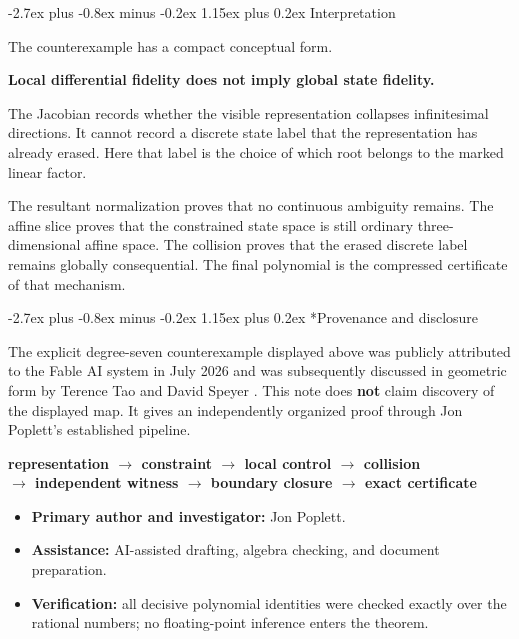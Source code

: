 \documentclass[11pt,letterpaper]{article}
\makeatletter
\theoremstyle{jgpplain}
\renewcommand{\section}{\@startsection{section}{1}{0pt}%
  {-2.7ex plus -0.8ex minus -0.2ex}%
  {1.15ex plus 0.2ex}%
  {\normalfont\sffamily\Large\bfseries\color{JGPBlue}}}
\makeatother
\begin{document}
\section{Interpretation}

The counterexample has a compact conceptual form.

\begin{mechanismbox}
\centering\bfseries\color{JGPInk}
Local differential fidelity does not imply global state fidelity.
\end{mechanismbox}

The Jacobian records whether the visible representation collapses
infinitesimal directions. It cannot record a discrete state label that the
representation has already erased. Here that label is the choice of which root
belongs to the marked linear factor.

The resultant normalization proves that no continuous ambiguity remains. The
affine slice proves that the constrained state space is still ordinary
three-dimensional affine space. The collision proves that the erased discrete
label remains globally consequential. The final polynomial is the compressed
certificate of that mechanism.

\section*{Provenance and disclosure}

The explicit degree-seven counterexample displayed above was publicly
attributed to the Fable AI system in July 2026 and was subsequently discussed
in geometric form by Terence Tao and David Speyer
\cite{Tao2026,Speyer2026}. This note does
\textbf{not} claim discovery of the displayed map. It gives an independently
organized proof through Jon Poplett's established pipeline.

\begin{routebox}
\centering\sffamily\bfseries\color{JGPDarkBlue}
representation \(\longrightarrow\) constraint
\(\longrightarrow\) local control
\(\longrightarrow\) collision\\[2pt]
\(\longrightarrow\) independent witness
\(\longrightarrow\) boundary closure
\(\longrightarrow\) exact certificate
\end{routebox}

\begin{itemize}
  \item \textbf{Primary author and investigator:} Jon Poplett.
  \item \textbf{Assistance:} AI-assisted drafting, algebra checking, and
        document preparation.
  \item \textbf{Verification:} all decisive polynomial identities were checked
        exactly over the rational numbers; no floating-point inference enters
        the theorem.
\end{itemize}
\end{document}

